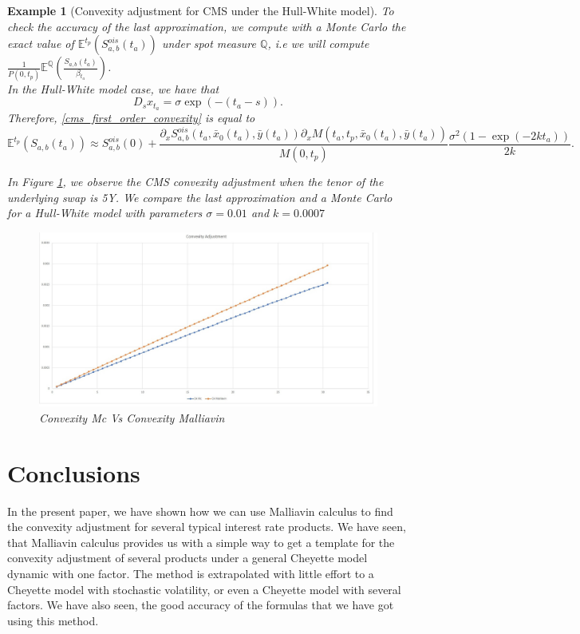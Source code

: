 \documentclass[a4paper,10pt]{article}
\newtheorem{example}[theorem]{Example}
\newcommand{\1}{\mathbf{1}}
\begin{document}
\begin{example}[Convexity adjustment for CMS under the Hull-White model]
To check the accuracy of the last approximation, we compute with a Monte Carlo the exact value of $\mathbb{E}^{t_p}\left(S^{ois}_{a,b}(t_a)\right)$ under spot measure $\mathbb{Q}$, i.e we will compute  $\frac{1}{P(0,t_p)}  \mathbb{E}^{\mathbb{Q}}\left(\frac{S_{a,b}(t_a)}{\beta_{t_a}} \right)$.\\
In the Hull-White model case, we have that
\begin{equation*}
D_s x_{t_a} = \sigma \exp(-(t_a - s)).
\end{equation*}
Therefore, \eqref{cms_first_order_convexity} is equal to
\begin{equation*}
\mathbb{E}^{t_p}\left(S_{a,b}(t_a)\right) \approx  S^{ois}_{a,b}(0) + \frac{\partial_x S^{ois}_{a,b}(t_a, \bar{x}_0(t_a),\bar{y}(t_a))\partial_x M(t_a,t_p, \bar{x}_0(t_a),\bar{y}(t_a))}{M(0,t_p)} \frac{\sigma^{2}(1-\exp(-2kt_a))}{2k}.
\end{equation*}

In Figure \ref{fig:CMS}, we observe the CMS convexity adjustment when the tenor of the underlying swap is 5Y. We compare the last approximation and a Monte Carlo for a Hull-White model with parameters $\sigma=0.01$ and $k=0.0007$

\begin{figure}[h]
	\begin{center}
		\includegraphics[scale=0.25]{Figures/cms_convexity_order.jpg}
	\end{center}
	\caption{Convexity Mc Vs Convexity Malliavin}
	\label{fig:CMS}
\end{figure} 
\end{example}


\section{Conclusions}\label{sec:Conclusion}
In the present paper, we have shown how we can use Malliavin calculus to find the convexity adjustment for several typical interest rate products. We have seen, that Malliavin calculus provides us with a simple way to get a template for the convexity adjustment of several products under a general Cheyette model dynamic with one factor. The method is extrapolated with little effort to a Cheyette model with stochastic volatility, or even a  Cheyette model with several factors. We have also seen, the good accuracy of the formulas that we have got using this method.
\end{document}
